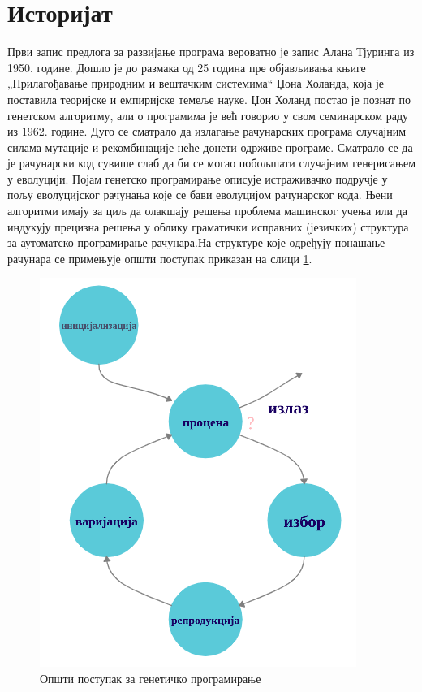 \documentclass[a4paper]{article}
\begin{document}
\section{Историјат}
Први запис предлога за развијање програма вероватно је запис Алана Тјуринга из 1950. године. Дошло је до размака од 25 година пре објављивања књиге „Прилагођавање природним и вештачким системима“ Џона Холанда, која је поставила теоријске и емпиријске темеље науке.
Џон Холанд постао је познат по генетском алгоритму, али о програмима је већ говорио у свом семинарском раду из 1962. године. Дуго се сматрало да излагање рачунарских програма
случајним силама мутације и рекомбинације неће донети одрживе програме. Сматрало се да је рачунарски код сувише слаб да би се могао побољшати случајним генерисањем у еволуцији.
Појам генетско програмирање описује истраживачко подручје у пољу еволуцијског рачунања које се бави еволуцијом рачунарског кода. Њени алгоритми имају за циљ да олакшају решења проблема машинског учења или да индукују прецизна решења у облику граматички исправних (језичких) структура за аутоматско програмирање рачунара.На структуре које одређују понашање рачунара се примењује општи поступак приказан на слици \ref{fig:istorija}.
\begin{figure}[h!]
    \begin{center}
        \includegraphics[scale=0.45]{istorija.png}
    \end{center}
    \caption{Општи поступак за генетичко програмирање}
    \label{fig:istorija}
\end{figure}
\end{document}
